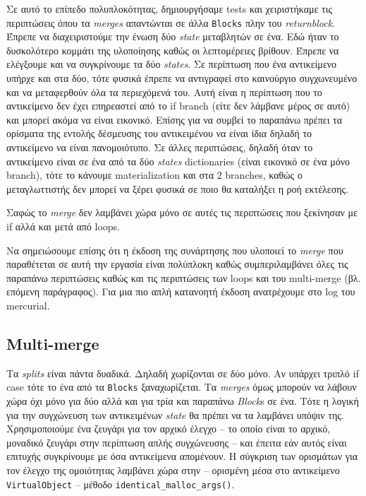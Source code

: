 Σε αυτό το επίπεδο πολυπλοκότητας, δημιουργήσαμε tests και χειριστήκαμε τις
περιπτώσεις όπου τα \textit{merges} απαντώνται σε άλλα \texttt{Blocks} πλην
του \textit{returnblock}. Έπρεπε να διαχειριστούμε την ένωση δύο
\textit{state} μεταβλητών σε ένα. Εδώ ήταν το δυσκολότερο κομμάτι της
υλοποίησης καθώς οι λεπτομέρειες βρίθουν. Έπρεπε να ελέγξουμε και να
συγκρίνουμε τα δύο \textit{states}. Σε περίπτωση που ένα αντικείμενο υπήρχε
και στα δύο, τότε φυσικά έπρεπε να αντιγραφεί στο καινούργιο συγχωνευμένο και
να μεταφερθούν όλα τα περιεχόμενά του. Αυτή είναι η περίπτωση που το
αντικείμενο δεν έχει επηρεαστεί από το if branch (είτε δεν λάμβανε μέρος σε
αυτό) και μπορεί ακόμα να είναι εικονικό. Επίσης για να συμβεί το παραπάνω
πρέπει τα ορίσματα της εντολής δέσμευσης του αντικειμένου να είναι ίδια δηλαδή
το αντικείμενο να είναι πανομοιότυπο. Σε άλλες περιπτώσεις, δηλαδή όταν το
αντικείμενο είναι σε ένα από τα δύο \textit{states} dictionaries (είναι
εικονικό σε ένα μόνο branch), τότε το κάνουμε materialization και στα 2
branches, καθώς ο μεταγλωττιστής δεν μπορεί να ξέρει φυσικά σε ποιο θα
καταλήξει η ροή εκτέλεσης.

Σαφώς το \textit{merge} δεν λαμβάνει χώρα μόνο σε αυτές τις περιπτώσεις που
ξεκίνησαν με if αλλά και μετά από loops.

Να σημειώσουμε επίσης ότι η έκδοση της συνάρτησης που υλοποιεί το \textit{merge}
που παραθέτεται σε αυτή την εργασία είναι πολύπλοκη καθώς συμπεριλαμβάνει όλες
τις παραπάνω περιπτώσεις καθώς και τις περιπτώσεις των loops και του multi-merge
(βλ. επόμενη παράγραφος). Για μια πιο απλή κατανοητή έκδοση ανατρέχουμε στο log
του mercurial.

\subsection{Multi-merge}

Τα \textit{splits} είναι πάντα δυαδικά. Δηλαδή χωρίζονται σε δύο μόνο. Αν
υπάρχει τριπλό if case τότε το ένα από τα \texttt{Blocks} ξαναχωρίζεται. Τα
\textit{merges} όμως μπορούν να λάβουν χώρα όχι μόνο για δύο αλλά και για τρία
και παραπάνω \textit{Block}s σε ένα. Τότε η λογική για την συγχώνευση των
αντικειμένων \textit{state} θα πρέπει να τα λαμβάνει υπόψιν της.
Χρησιμοποιούμε ένα ζευγάρι για τον αρχικό έλεγχο – το οποίο είναι το αρχικό,
μοναδικό ζευγάρι στην περίπτωση απλής συγχώνευσης – και έπειτα εάν αυτός είναι
επιτυχής συγκρίνουμε με όσα αντικείμενα απομένουν. Η σύγκριση των ορισμάτων
για τον έλεγχο της ομοιότητας λαμβάνει χώρα στην – ορισμένη μέσα στο
αντικείμενο \texttt{VirtualObject} – μέθοδο \texttt{identical\_malloc\_args()}.

